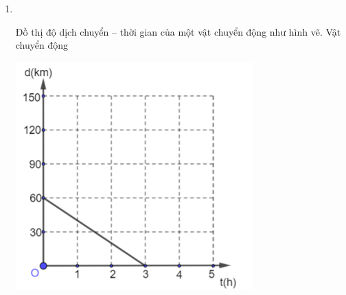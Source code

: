\begin{enumerate}[label=\bfseries Câu \arabic*:]
\item {}\\
{\begin{minipage}[l]{0.6\textwidth}
		Đồ thị độ dịch chuyển – thời gian của một vật chuyển động như hình vẽ. Vật chuyển động
	\end{minipage}
	\begin{minipage}{0.4\textwidth}
		\begin{center}
			\includegraphics[width=0.6\linewidth]{../figs/VN10-2023-PH-TP005-P-6}
		\end{center}
	\end{minipage}
}


\end{enumerate}
